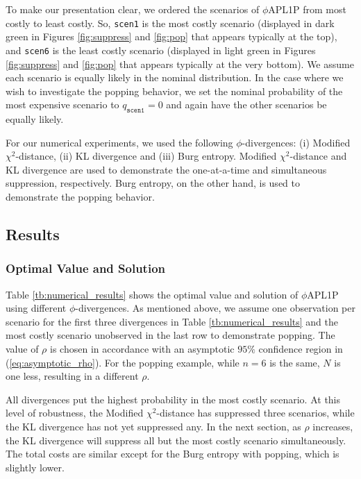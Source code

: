 \documentclass[opre,nonblindrev]{informs3} %
\begin{document}
To make our presentation clear, we ordered the scenarios of $\phi$APL1P from most costly to least costly. 
So, \texttt{scen1} is the most costly scenario  (displayed in dark green in Figures \ref{fig:suppress} and \ref{fig:pop} that appears typically at the top), and  \texttt{scen6} is the least costly scenario (displayed in light green in Figures \ref{fig:suppress} and \ref{fig:pop} that appears typically at the very bottom). 
We assume each scenario is equally likely in the nominal distribution. 
In the case where we wish to investigate the popping behavior, we set the nominal probability of the most expensive scenario to $q_{\texttt{scen1}} = 0$ and again have the other scenarios be equally likely.  


For our numerical experiments, we used the following $\phi$-divergences: (i) Modified $\chi^2$-distance, (ii) KL divergence and (iii) Burg entropy.  
Modified $\chi^2$-distance and KL divergence are used to demonstrate the one-at-a-time and simultaneous suppression, respectively. 
Burg entropy, on the other hand, is used to demonstrate the popping behavior. 


\subsection{Results}
\label{ssec:numerical_results}


\subsubsection{Optimal Value and Solution}
\label{ssec:opt}

Table \ref{tb:numerical_results} shows the optimal value and solution of $\phi$APL1P using different $\phi$-divergences.  
As mentioned above, we assume one observation per scenario for the first three divergences in Table \ref{tb:numerical_results} and the most costly scenario unobserved in the last row to demonstrate popping.
The value of $\rho$ is chosen in accordance with an asymptotic $95\%$ confidence region in (\ref{eq:asymptotic_rho}).
For the popping example, while $n=6$ is the same, $N$ is one less, resulting in a different $\rho$. 

All divergences put the highest probability in the most costly scenario. 
At this level of robustness, the Modified $\chi^2$-distance has suppressed three scenarios, while the KL divergence has not yet suppressed any.
In the next section, as $\rho$ increases, the KL divergence will suppress all but the most costly scenario simultaneously. 
The total costs are similar except for the Burg entropy with popping, which is slightly lower.
\end{document}

